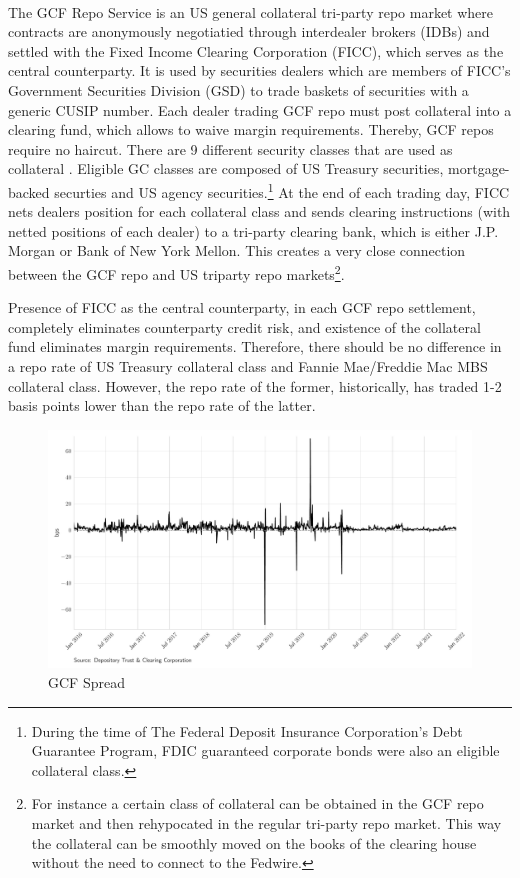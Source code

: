 \documentclass[11pt,a4paper,english,oneside]{article}
\begin{document}
The GCF Repo\textsuperscript{\tiny\textregistered} Service is an US general collateral tri-party repo market where contracts are anonymously negotiatied through interdealer brokers (IDBs) and settled with the Fixed Income Clearing Corporation (FICC), which serves as the central counterparty.  It is used by securities dealers which are members of FICC's Government Securities Division (GSD) to trade baskets of securities with a generic CUSIP number. Each dealer trading GCF repo must post collateral into a clearing fund, which allows to waive margin requirements. Thereby, GCF repos require no haircut. There are 9 different security classes that are used as collateral \citep{dtcc2012}. Eligible GC classes are composed of US Treasury securities, mortgage-backed securties and US agency securities.\footnote{During the time of The Federal Deposit Insurance Corporation’s Debt Guarantee Program, FDIC guaranteed corporate bonds were also an eligible collateral class.} At the end of each trading day, FICC nets dealers position for each collateral class and sends clearing instructions (with netted positions of each dealer) to a tri-party clearing bank, which is either J.P. Morgan or Bank of New York Mellon. This creates a very close connection between the GCF repo and US triparty repo markets\footnote{For instance a certain class of collateral can be obtained in the GCF repo market and then rehypocated in the regular tri-party repo market. This way the collateral can be smoothly moved on the books of the clearing house without the need to connect to the Fedwire.}.

Presence of FICC as the central counterparty, in each GCF repo settlement, completely eliminates counterparty credit risk, and existence of the collateral fund eliminates margin requirements. Therefore, there should be no difference in a repo rate of US Treasury collateral class and Fannie Mae/Freddie Mac MBS collateral class. However, the repo rate of the former, historically, has traded 1-2 basis points lower than the repo rate of the latter. 

\begin{figure}[htb!]
  \begin{center}
    \caption{GCF Spread}
    \includegraphics[width=0.99\linewidth]{gcf_spread.pdf}
  \end{center}
  \label{fig:rates}
\end{figure}
\end{document}
